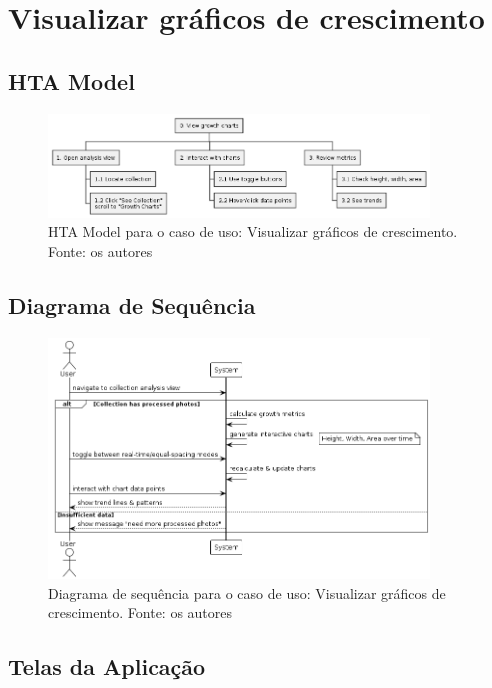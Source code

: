 \section{Visualizar gráficos de crescimento}

\subsection{HTA Model}

\begin{figure}[H]
    \centering
    \includegraphics[width=0.9\textwidth]{../figures/hta/UC014.png}
    \caption{HTA Model para o caso de uso: Visualizar gráficos de crescimento. Fonte: os autores}
    \label{fig:hta-uc014}
\end{figure}

\subsection{Diagrama de Sequência}

\begin{figure}[H]
    \centering
    \includegraphics[width=0.9\textwidth]{../figures/dss/UC014.png}
    \caption{Diagrama de sequência para o caso de uso: Visualizar gráficos de crescimento. Fonte: os autores}
    \label{fig:dss-uc014}
\end{figure}

\subsection{Telas da Aplicação}

